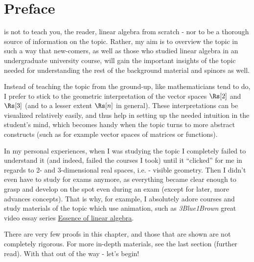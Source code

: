 \section{Preface}
 is not to teach you, the reader, linear algebra from scratch - nor to be a thorough source of information on the topic. Rather, my aim is to overview the topic in such a way that new-comers, as well as those who studied linear algebra in an undergraduate university course, will gain the important insights of the topic needed for understanding the rest of the background material and spinors as well.

Instead of teaching the topic from the ground-up, like mathematicians tend to do, I prefer to stick to the geometric interpretation of the vector spaces $\Rs[2]$ and $\Rs[3]$ (and to a lesser extent $\Rs[n]$ in general). These interpretations can be visualized relatively easily, and thus help in setting up the needed intuition in the student's mind, which becomes handy when the topic turns to more abstract constructs (such as for example vector spaces of matrices or functions).

In my personal experiences, when I was studying the topic I completely failed to understand it (and indeed, failed the courses I took) until it \enquote{clicked} for me in regards to 2- and 3-dimensional real spaces, i.e. - visible geometry. Then I didn't even have to study for exams anymore, as everything became clear enough to grasp and develop on the spot even during an exam (except for later, more advances concepts). That is why, for example, I absolutely adore courses and study materials of the topic which use animation, such as \textit{3Blue1Brown} great video essay series \href{https://www.3blue1brown.com/topics/linear-algebra}{Essence of linear algebra}.

There are very few proofs in this chapter, and those that are shown are not completely rigorous. For more in-depth materials, see the last section (further read). With that out of the way - let's begin!
